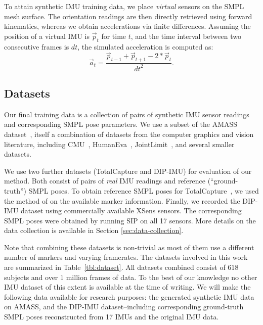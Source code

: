 \documentclass[acmtog]{acmart}
\begin{document}
To attain synthetic IMU training data, we place \emph{virtual} sensors on the SMPL mesh surface. The orientation readings are then directly retrieved using forward kinematics, whereas we obtain accelerations via finite differences. Assuming the position of a virtual IMU is $\vec{p}_t$ for time $t$, and the time interval between two consecutive frames is $dt$, the simulated acceleration is computed as:
\begin{equation}
\vec{a}_t = \frac{\vec{p}_{t-1} + \vec{p}_{t+1} - 2*\vec{p}_t}{{dt}^2}.
\end{equation}\subsection{Datasets}\label{sec:datasets}
Our final training data is a collection of pairs of synthetic IMU sensor readings and corresponding SMPL pose parameters. We use a subset of the AMASS dataset~\cite{MoShPP}, itself a combination of datasets from the computer graphics and vision literature, including CMU~\cite{MoCapCMU}, HumanEva~\cite{sigal2010humaneva}, JointLimit~\cite{akhter2015pose}, and several smaller datasets.

We use two further datasets (TotalCapture and DIP-IMU) for evaluation of our method. Both consist of pairs of \textit{real} IMU readings and reference (``ground-truth'') SMPL poses. To obtain reference SMPL poses for TotalCapture~\cite{trumble2017total}, we used the method of \cite{loper2014mosh} on the available marker information. Finally, we recorded the DIP-IMU dataset using commercially available XSens sensors. The corresponding SMPL poses were obtained by running SIP \cite{von2017sparse} on all 17 sensors. More details on the data collection is available in Section \ref{sec:data-collection}.

Note that combining these datasets is non-trivial as most of them use a different number of markers and varying framerates. The datasets involved in this work are summarized in Table~\ref{tbl:dataset}. All datasets combined consist of $618$ subjects and over $1$ million frames of data. To the best of our knowledge no other IMU dataset of this extent is available at the time of writing. We will make the following data available for research purposes: the generated synthetic IMU data on AMASS, and the DIP-IMU dataset--including corresponding ground-truth SMPL poses reconstructed from 17 IMUs and the original IMU data.
\end{document}
